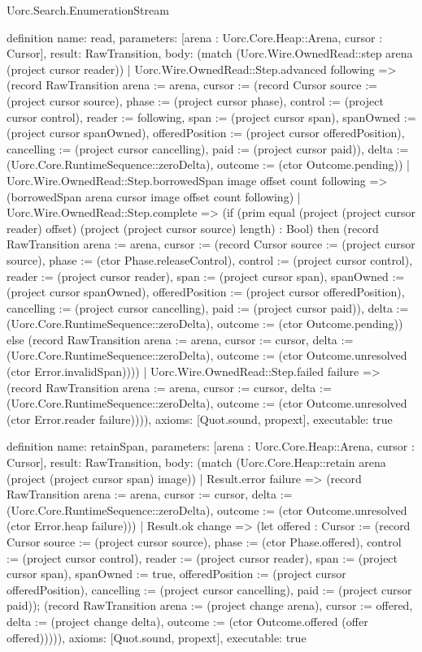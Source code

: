 \begin{lexlean}{Uorc.Search.EnumerationStream}
\begin{semanticmodule}
definition{
  name: read,
  parameters: [arena : Uorc.Core.Heap::Arena, cursor : Cursor],
  result: RawTransition,
  body: (match (Uorc.Wire.OwnedRead::step arena (project cursor reader))
    | Uorc.Wire.OwnedRead::Step.advanced following => (record RawTransition {arena := arena, cursor := (record Cursor {source := (project cursor source), phase := (project cursor phase), control := (project cursor control), reader := following, span := (project cursor span), spanOwned := (project cursor spanOwned), offeredPosition := (project cursor offeredPosition), cancelling := (project cursor cancelling), paid := (project cursor paid)}), delta := (Uorc.Core.RuntimeSequence::zeroDelta), outcome := (ctor Outcome.pending)})
    | Uorc.Wire.OwnedRead::Step.borrowedSpan image offset count following => (borrowedSpan arena cursor image offset count following)
    | Uorc.Wire.OwnedRead::Step.complete => (if (prim equal (project (project cursor reader) offset) (project (project cursor source) length) : Bool) then (record RawTransition {arena := arena, cursor := (record Cursor {source := (project cursor source), phase := (ctor Phase.releaseControl), control := (project cursor control), reader := (project cursor reader), span := (project cursor span), spanOwned := (project cursor spanOwned), offeredPosition := (project cursor offeredPosition), cancelling := (project cursor cancelling), paid := (project cursor paid)}), delta := (Uorc.Core.RuntimeSequence::zeroDelta), outcome := (ctor Outcome.pending)}) else (record RawTransition {arena := arena, cursor := cursor, delta := (Uorc.Core.RuntimeSequence::zeroDelta), outcome := (ctor Outcome.unresolved (ctor Error.invalidSpan))}))
    | Uorc.Wire.OwnedRead::Step.failed failure => (record RawTransition {arena := arena, cursor := cursor, delta := (Uorc.Core.RuntimeSequence::zeroDelta), outcome := (ctor Outcome.unresolved (ctor Error.reader failure))})),
  axioms: [Quot.sound, propext],
  executable: true
}

definition{
  name: retainSpan,
  parameters: [arena : Uorc.Core.Heap::Arena, cursor : Cursor],
  result: RawTransition,
  body: (match (Uorc.Core.Heap::retain arena (project (project cursor span) image))
    | Result.error failure => (record RawTransition {arena := arena, cursor := cursor, delta := (Uorc.Core.RuntimeSequence::zeroDelta), outcome := (ctor Outcome.unresolved (ctor Error.heap failure))})
    | Result.ok change => (let offered : Cursor := (record Cursor {source := (project cursor source), phase := (ctor Phase.offered), control := (project cursor control), reader := (project cursor reader), span := (project cursor span), spanOwned := true, offeredPosition := (project cursor offeredPosition), cancelling := (project cursor cancelling), paid := (project cursor paid)}); (record RawTransition {arena := (project change arena), cursor := offered, delta := (project change delta), outcome := (ctor Outcome.offered (offer offered))}))),
  axioms: [Quot.sound, propext],
  executable: true
}


\end{semanticmodule}
\end{lexlean}
